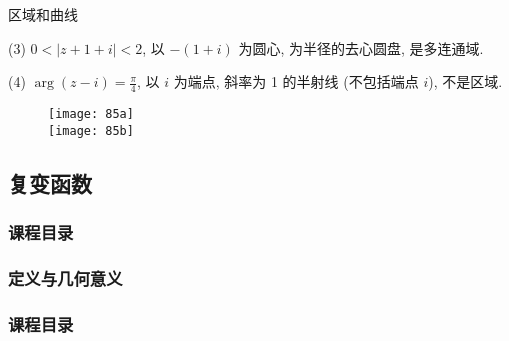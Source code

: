 \documentclass{beamer}
\begin{document}
\begin{frame}{区域和曲线}
\begin{block}{}
\begin{minipage}[t]{0.5\linewidth}
(3) $ 0 < |z + 1 + i| < 2 $,  以 $ - (1 + i) $ 为圆心, 为半径的去心圆盘, 是多连通域.

\vspace{15mm}

(4) $ \arg (z - i) = \frac{\pi }{4} $,  以 $ i $ 为端点, 斜率为 1 的半射线 (不包括端点 $ i $), 不是区域.

\end{minipage}\qquad
\begin{minipage}[t]{0.25\linewidth}
\begin{figure}\centering\vspace{-3mm}
\texttt{[image: 85a]}\\
\texttt{[image: 85b]}\\
\end{figure}
\end{minipage}

\end{block}
\end{frame}

\subsection{复变函数}
\begin{frame}
\frametitle{课程目录}
\tableofcontents[currentsubsection ] %
\end{frame}

\subsubsection{定义与几何意义}

\begin{frame}
\frametitle{课程目录}
\tableofcontents[currentsubsection ] %
\end{frame}
\end{document}
